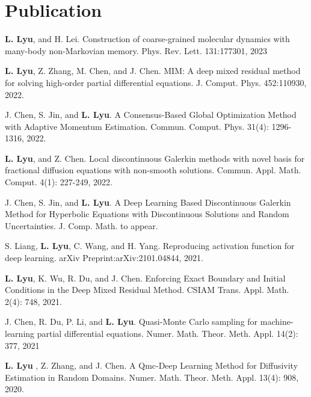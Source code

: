 \documentclass[a4paper,10pt,utf8]{article} %
\begin{document}
%	
%
\section{Publication}

\begin{small}

\textbf{L. Lyu}, and H. Lei. Construction of coarse-grained molecular dynamics with many-body non-Markovian memory. Phys. Rev. Lett. 131:177301, 2023

\textbf{L. Lyu}, Z. Zhang, M. Chen, and J. Chen. MIM: A deep mixed residual method for solving high-order partial differential equations. J. Comput. Phys. 452:110930, 2022. 

J. Chen, S. Jin, and \textbf{L. Lyu}. A Consensus-Based Global Optimization Method with Adaptive Momentum Estimation.
Commun. Comput. Phys. 31(4): 1296-1316, 2022.

\textbf{L. Lyu}, and Z. Chen. Local discontinuous Galerkin methods with novel basis for fractional diffusion equations with non-smooth solutions. Commun. Appl. Math. Comput.  4(1): 227-249, 2022.

J. Chen, S. Jin, and \textbf{L. Lyu}. A Deep Learning Based Discontinuous Galerkin Method for Hyperbolic Equations with Discontinuous Solutions and Random Uncertainties. J. Comp. Math. to appear.

S. Liang, \textbf{L. Lyu}, C. Wang, and H. Yang. Reproducing activation function for deep learning. arXiv Preprint:arXiv:2101.04844, 2021.

\textbf{L. Lyu}, K. Wu, R. Du, and J. Chen. Enforcing Exact Boundary and Initial Conditions in the Deep Mixed Residual Method. CSIAM Trans. Appl. Math. 2(4): 748, 2021.

J. Chen, R. Du, P. Li, and \textbf{L. Lyu}. Quasi-Monte Carlo sampling for machine-learning partial differential equations. Numer. Math. Theor. Meth. Appl. 14(2): 377, 2021

\textbf{L. Lyu} , Z. Zhang, and J. Chen. A Qmc-Deep Learning Method for Diffusivity Estimation in Random Domains. Numer. Math. Theor. Meth. Appl. 13(4): 908, 2020.


\end{small}
\end{document}
